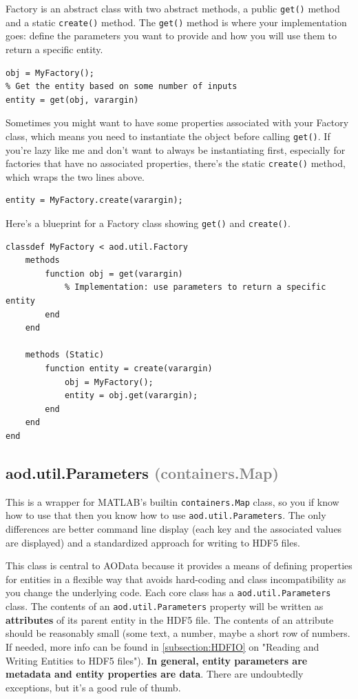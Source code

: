 \documentclass[10pt]{exam}
\newcommand\myurl[1]{\textcolor{blue}{\underline{#1}}}
\newcommand\myparent[1]{\textcolor{gray}{(#1)}}
\newcommand\aodclass[1]{\textcolor{codeblue}{\texttt{#1}}}
\newcommand\aodfcn[1]{\textcolor{darkteal}{\texttt{#1}}}
\begin{document}
		Factory is an abstract class with two abstract methods, a public \aodfcn{get()} method and a static \aodfcn{create()} method. The \aodfcn{get()} method is where your implementation goes: define the parameters you want to provide and how you will use them to return a specific entity. 
		\begin{lstlisting}[style=matlab-editor, basicstyle=\mlttfamily\footnotesize]
% Instantiate the object
obj = MyFactory();
% Get the entity based on some number of inputs
entity = get(obj, varargin)
		\end{lstlisting}
		Sometimes you might want to have some properties associated with your Factory class, which means you need to instantiate the object before calling \aodfcn{get()}. If you're lazy like me and don't want to always be instantiating first, especially for factories that have no associated properties, there's the static \aodfcn{create()} method, which wraps the two lines above.
		\begin{lstlisting}[style=matlab-editor, basicstyle=\mlttfamily\footnotesize]
% Get the entity using create
entity = MyFactory.create(varargin);
		\end{lstlisting}
		Here's a blueprint for a Factory class showing \aodfcn{get()} and \aodfcn{create()}.
		\begin{lstlisting}[style=matlab-editor, basicstyle=\mlttfamily\footnotesize]
classdef MyFactory < aod.util.Factory
	methods 
		function obj = get(varargin)
			% Implementation: use parameters to return a specific entity
		end
	end

	methods (Static)
		function entity = create(varargin)
			obj = MyFactory();
			entity = obj.get(varargin);
		end
	end
end
		\end{lstlisting}
		
	\subsection{aod.util.Parameters \myparent{containers.Map}}
		\noindent  This is a wrapper for MATLAB's builtin \aodclass{containers.Map} class, so you if know how to use that then you know how to use \aodclass{aod.util.Parameters}. The only differences are better command line display (each key and the associated values are displayed) and a standardized approach for writing to HDF5 files. 
		
		This class is central to AOData because it provides a means of defining properties for entities in a flexible way that avoids hard-coding and class incompatibility as you change the underlying code. 
		Each core class has a \aodclass{aod.util.Parameters} class. The contents of an \aodclass{aod.util.Parameters} property will be written as \textbf{attributes} of its parent entity in the HDF5 file. The contents of an attribute should be reasonably small (some text, a number, maybe a short row of numbers. If needed, more info can be found in \myurl{\ref{subsection:HDFIO}} on "Reading and Writing Entities to HDF5 files").  \textbf{In general, entity parameters are metadata and entity properties are data}. There are undoubtedly exceptions, but it's a good rule of thumb.
		
\end{document}
